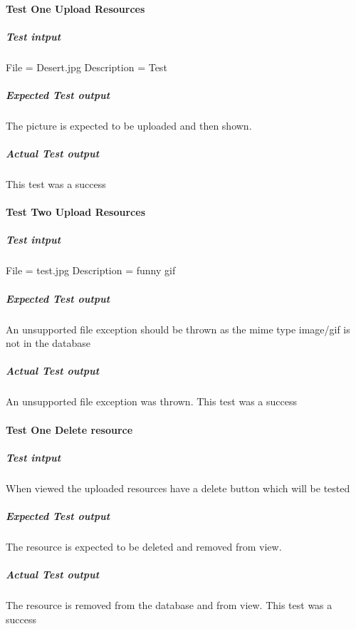 \paragraph{Test One Upload Resources}
	\subparagraph{Test intput}
	File = Desert.jpg
	Description = Test
	\subparagraph{Expected Test output}
	The picture is expected to be uploaded and then shown.
	\subparagraph{Actual Test output}
	This test was a success

\paragraph{Test Two Upload Resources}
	\subparagraph{Test intput}
	File = test.jpg
	Description = funny gif
	\subparagraph{Expected Test output}
	An unsupported file exception should be thrown as the mime type image/gif is not in the database
	\subparagraph{Actual Test output}
	An unsupported file exception was thrown. This test was a success

\paragraph{Test One Delete resource}
	\subparagraph{Test intput}
	When viewed the uploaded resources have a delete button which will be tested
	\subparagraph{Expected Test output}
	The resource is expected to be deleted and removed from view.
	\subparagraph{Actual Test output}
	The resource is removed from the database and from view. This test was a success 
